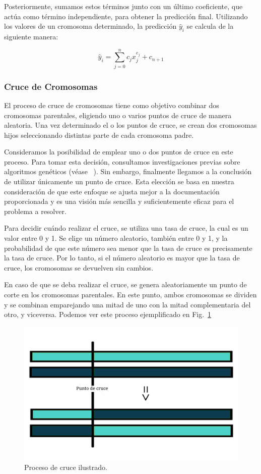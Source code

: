 \documentclass[conference,a4paper]{IEEEtran}
\def\figurename{Fig.}
\begin{document}
Posteriormente, sumamos estos términos junto con un último coeficiente, que actúa como término independiente, para obtener la predicción final. Utilizando los valores de un cromosoma determinado, la predicción \(\hat{y}_i\) se calcula de la siguiente manera:

\[
\hat{y}_i = \sum_{j=0}^{n} c_j x_j^{e_j} + c_{n+1}
\]


\subsubsection{Cruce de Cromosomas}
El proceso de cruce de cromosomas tiene como objetivo combinar dos cromosomas parentales, eligiendo uno o varios puntos de cruce de manera aleatoria. Una vez determinado el o los puntos de cruce, se crean dos cromosomas hijos seleccionando distintas parte de cada cromosoma padre. 

Consideramos la posibilidad de emplear uno o dos puntos de cruce en este proceso. Para tomar esta decisión, consultamos investigaciones previas sobre algoritmos genéticos (véase ~\cite{b1}). Sin embargo, finalmente llegamos a la conclusión de utilizar únicamente un punto de cruce. Esta elección se basa en nuestra consideración de que este enfoque se ajusta mejor a la documentación proporcionada y es una visión más sencilla y suficientemente eficaz para el problema a resolver.

Para decidir cuándo realizar el cruce, se utiliza una tasa de cruce, la cual es un valor entre 0 y 1. Se elige un número aleatorio, también entre 0 y 1, y la probabilidad de que este número sea menor que la tasa de cruce es precisamente la tasa de cruce. Por lo tanto, si el número aleatorio es mayor que la tasa de cruce, los cromosomas se devuelven sin cambios. 

En caso de que se deba realizar el cruce, se genera aleatoriamente un punto de corte en los cromosomas parentales. En este punto, ambos cromosomas se dividen y se combinan emparejando una mitad de uno con la mitad complementaria del otro, y viceversa. Podemos ver este proceso ejemplificado en \figurename~\ref{fig:chromosome-crossover}


\begin{figure}[h]
    \centering
    \includegraphics[width=\columnwidth]
    {image-chromosome-crossover.jpg}
    \caption{Proceso de cruce ilustrado.}
    \label{fig:chromosome-crossover}
\end{figure}
\end{document}

